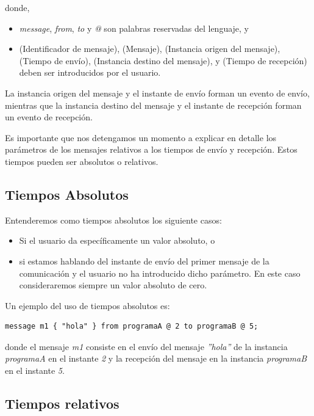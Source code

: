 \documentclass[12pt,a4paper]{report}
\begin{document}
donde,
\begin{itemize}
\item \textit{message}, \textit{from}, \textit{to} y \textit{@} son palabras reservadas del lenguaje, y
\item (Identificador de mensaje), (Mensaje), (Instancia origen del mensaje), (Tiempo de envío), (Instancia destino del mensaje), y (Tiempo de recepción) deben ser introducidos por el usuario.
\end{itemize}

La instancia origen del mensaje y el instante de envío forman un evento de envío, mientras que la instancia destino del mensaje y el instante de recepción forman un evento de recepción.

Es importante que nos detengamos un momento a explicar en detalle los parámetros de los mensajes relativos a los tiempos de envío y recepción. Estos tiempos pueden ser absolutos o relativos.

\subsection{Tiempos Absolutos}

Entenderemos como tiempos absolutos los siguiente casos:

\begin{itemize}
\item Si el usuario da específicamente un valor absoluto, o
\item si estamos hablando del instante de envío del primer mensaje de la comunicación y el usuario no ha introducido dicho parámetro. En este caso consideraremos siempre un valor absoluto de cero. 
\end{itemize}

Un ejemplo del uso de tiempos absolutos es:

\begin{verbatim}
message m1 { "hola" } from programaA @ 2 to programaB @ 5;
\end{verbatim}

donde el mensaje \textit{m1} consiste en el envío del mensaje \textit{''hola''} de la instancia \textit{programaA} en el instante \textit{2} y la recepción del mensaje en la instancia \textit{programaB} en el instante \textit{5}.

\subsection{Tiempos relativos}
\end{document}
